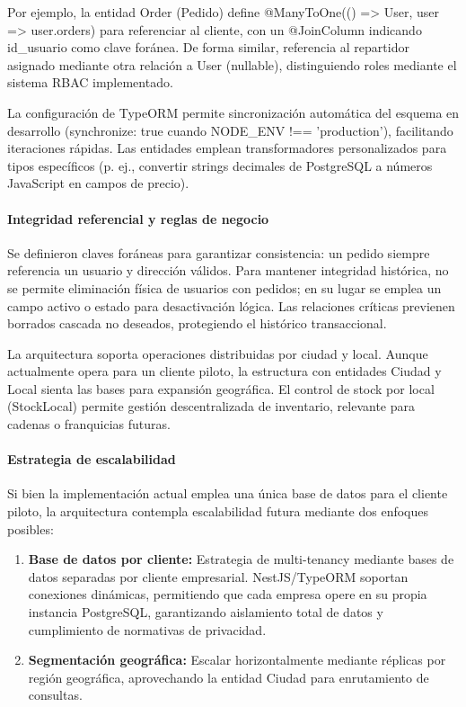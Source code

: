   Por ejemplo, la entidad Order (Pedido) define @ManyToOne(() => User, user => user.orders) para referenciar al cliente, con un @JoinColumn indicando id\_usuario como clave foránea. De forma similar, referencia al repartidor asignado mediante otra relación a User (nullable), distinguiendo roles mediante el sistema RBAC implementado.

  La configuración de TypeORM permite sincronización automática del esquema en desarrollo (synchronize: true cuando NODE\_ENV !== 'production'), facilitando iteraciones rápidas. Las entidades emplean transformadores personalizados para tipos específicos (p. ej., convertir strings decimales de PostgreSQL a números JavaScript en campos de precio).

  \paragraph{Integridad referencial y reglas de negocio}
  Se definieron claves foráneas para garantizar consistencia: un pedido siempre referencia un usuario y dirección válidos. Para mantener integridad histórica, no se permite eliminación física de usuarios con pedidos; en su lugar se emplea un campo activo o estado para desactivación lógica. Las relaciones críticas previenen borrados cascada no deseados, protegiendo el histórico transaccional.

  La arquitectura soporta operaciones distribuidas por ciudad y local. Aunque actualmente opera para un cliente piloto, la estructura con entidades Ciudad y Local sienta las bases para expansión geográfica. El control de stock por local (StockLocal) permite gestión descentralizada de inventario, relevante para cadenas o franquicias futuras.

  \paragraph{Estrategia de escalabilidad}
  Si bien la implementación actual emplea una única base de datos para el cliente piloto, la arquitectura contempla escalabilidad futura mediante dos enfoques posibles:
  \begin{enumerate}[label=\arabic*)]
    \item \textbf{Base de datos por cliente:} Estrategia de multi-tenancy mediante bases de datos separadas por cliente empresarial. NestJS/TypeORM soportan conexiones dinámicas, permitiendo que cada empresa opere en su propia instancia PostgreSQL, garantizando aislamiento total de datos y cumplimiento de normativas de privacidad.
    \item \textbf{Segmentación geográfica:} Escalar horizontalmente mediante réplicas por región geográfica, aprovechando la entidad Ciudad para enrutamiento de consultas.
  \end{enumerate}

